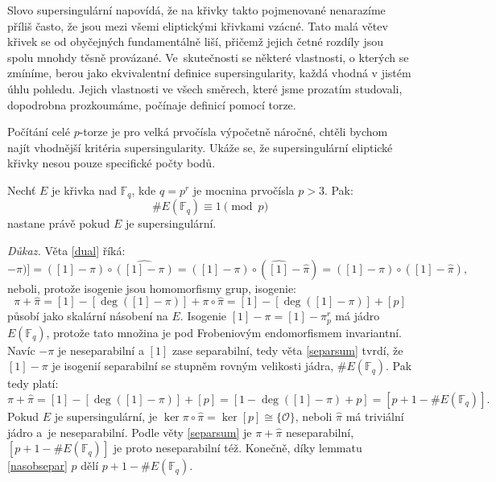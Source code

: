 \documentclass[12pt]{report}
\begin{document}
Slovo supersingulární napovídá, že na křivky takto pojmenované nenarazíme příliš často, že jsou mezi všemi eliptickými křivkami vzácné. Tato malá větev křivek se od obyčejných fundamentálně liší, přičemž jejich četné rozdíly jsou spolu mnohdy těsně provázané. Ve~skutečnosti se některé vlastnosti, o kterých se zmíníme, berou jako ekvivalentní definice supersingularity, každá vhodná v jistém úhlu pohledu. Jejich vlastnosti ve všech směrech, které jsme prozatím studovali, dopodrobna prozkoumáme, počínaje definicí pomocí torze.

Počítání celé $p$-torze je pro velká prvočísla výpočetně náročné, chtěli bychom najít vhodnější kritéria supersingularity. Ukáže se, že supersingulární eliptické křivky nesou pouze specifické počty bodů.

\begin{veta}\label{super}
Nechť $E$ je křivka nad $\mathbb{F}_q$, kde $q = p^r$ je mocnina prvočísla $p > 3$. Pak: $$\# E(\mathbb{F}_q) \equiv 1 \pmod{p}$$ nastane právě pokud $E$ je supersingulární.
\end{veta}

\noindent \textit{Důkaz.} Věta \ref{dual} říká:
\begin{equation*}
[\deg([1]-\pi)] = ([1]-\pi) \circ \widehat{([1]-\pi)} = ([1]-\pi) \circ (\widehat{[1]}-\widehat{\pi}) = ([1]-\pi) \circ ([1]-\widehat{\pi}),
\end{equation*} 
neboli, protože isogenie jsou homomorfismy grup, isogenie:
\begin{equation*}
\pi+\widehat{\pi} = [1] - [\deg([1]-\pi)]+\pi \circ \widehat{\pi} = [1]-[\deg([1]-\pi)]+[p]
\end{equation*}
působí jako skalární násobení na $E$. Isogenie $[1]-\pi = [1] - \pi_p ^r$ má jádro $E(\mathbb{F}_q)$, protože tato množina je pod Frobeniovým endomorfismem invariantní. Navíc $-\pi$ je neseparabilní a $[1]$ zase separabilní, tedy věta \ref{separsum} tvrdí, že $[1]-\pi$ je isogenií separabilní se stupněm rovným velikosti jádra, $\#E(\mathbb{F}_q)$. Pak tedy platí:
\begin{equation*}
\pi+\widehat{\pi}  = [1]-[\deg([1]-\pi)]+[p] = [1-\deg ([1]-\pi)+p] =  [p+1-\#E(\mathbb{F}_q)].
\end{equation*}
Pokud $E$ je supersingulární, je $\ker \pi \circ \widehat{\pi} = \ker [p] \cong \lbrace \mathcal{O} \rbrace$, neboli $\widehat{\pi}$ má triviální jádro a~je neseparabilní. Podle věty \ref{separsum} je $\pi+\widehat{\pi}$ neseparabilní, $[p+1-\#E(\mathbb{F}_q)]$ je proto neseparabilní též.  Konečně, díky lemmatu \ref{nasobsepar} $p$ dělí $p+1-\#E(\mathbb{F}_q)$.
\end{document}
